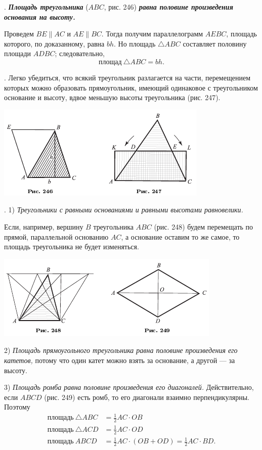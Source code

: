 \documentclass[oneside]{book}
\begin{document}
.
\textbf{\emph{Площадь треугольника}} ($ABC$, рис. 246) \textbf{\emph{равна половине произведения основания на высоту.}}

Проведем $BE \parallel  AC$ и $AE \parallel BC$.
Тогда получим параллелограмм $AEBC$, площадь которого, по доказанному, равна $bh$.
Но площадь $\triangle ABC$ составляет половину площади $ADBC$;
следовательно,
\[\text{площад}~ \triangle ABC=bh.\]

.
Легко убедиться, что всякий треугольник разлагается на части, перемещением которых можно образовать прямоугольник, имеющий одинаковое с треугольником основание и высоту, вдвое меньшую высоты треугольника (рис. 247).

\includegraphics{pics/ris-246-247}

.
1) \emph{Треугольники с равными основаниями и равными высотами равновелики.}

Если, например, вершину $B$ треугольника $ABC$ (рис. 248) будем перемещать по прямой, параллельной основанию $AC$, а основание оставим то же самое, то площадь треугольника не будет изменяться.

\includegraphics{pics/ris-248-249}

2) \emph{Площадь прямоугольного треугольника равна половине произведения его катетов,} потому что один катет можно взять за основание, а другой — за высоту.

3) \emph{Площадь ромба равна половине произведения его диагоналей.}
Действительно, если $ABCD$ (рис. 249) есть ромб, то его диагонали взаимно перпендикулярны.
Поэтому
\begin{align*}
\text{площадь}~\triangle ABC&=\tfrac12AC\cdot  OB
\\
\text{площадь}~\triangle ACD&=\tfrac12AC\cdot  OD
\\ %
\text{площадь}~ABCD&=\tfrac12AC\cdot (OB+OD)=\tfrac12AC\cdot BD.
\end{align*}
\end{document}
